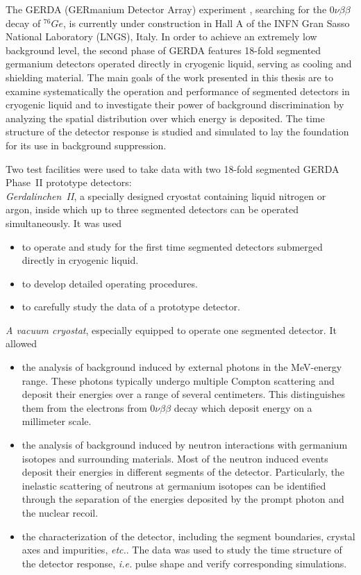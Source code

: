 The GERDA (GERmanium Detector Array) experiment \cite{Abt04, Sch05}, searching for the $0\nu\beta\beta$ decay of $^{76}Ge$, is currently under construction in Hall A of the INFN Gran Sasso National Laboratory (LNGS), Italy. In order to achieve an extremely low background level, the second phase of GERDA features 18-fold segmented germanium detectors operated directly in cryogenic liquid, serving as cooling and shielding material. The main goals of the work presented in this thesis are to examine systematically the operation and performance of segmented detectors in cryogenic liquid and to investigate their power of background discrimination by analyzing the spatial distribution over which energy is deposited. The time structure of the detector response is studied and simulated to lay the foundation for its use in background suppression.

Two test facilities were used to take data with two 18-fold segmented GERDA Phase~II prototype detectors:\\
\emph{Gerdalinchen~II}, a specially designed cryostat containing liquid nitrogen or argon, inside which up to three segmented detectors can be operated simultaneously. It was used 
\begin{itemize}
\item to operate and study for the first time segmented detectors submerged directly in cryogenic liquid.
\item to develop detailed operating procedures.
\item to carefully study the data of a prototype detector.
\end{itemize}
\emph{ A vacuum cryostat}, especially equipped to operate one segmented detector. It allowed
\begin{itemize}
\item the analysis of background induced by external photons in the MeV-energy range. These photons typically undergo multiple Compton scattering and deposit their energies over a range of several centimeters. This distinguishes them from the electrons from $0\nu\beta\beta$ decay which deposit energy on a millimeter scale.
\item the analysis of background induced by neutron interactions with germanium isotopes and surrounding materials. Most of the neutron induced events deposit their energies in different segments of the detector. Particularly, the inelastic scattering of neutrons at germanium isotopes can be identified through the separation of the energies deposited by the prompt photon and the nuclear recoil.
\item the characterization of the detector, including the segment boundaries, crystal axes and impurities, \textit{etc.}. The data was used to study the time structure of the detector response, \textit{i.e.} pulse shape and verify corresponding simulations. 
\end{itemize}

